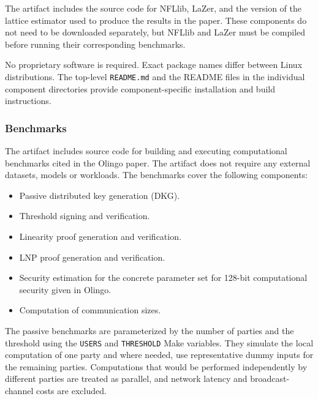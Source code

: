 \documentclass[nonacm,sigconf]{acmart}
\begin{document}
The artifact includes the source code for NFLlib, LaZer, and the version of the lattice estimator used to produce the results in the paper. These components do not need to be downloaded separately, but NFLlib and LaZer must be compiled before running their corresponding benchmarks.

No proprietary software is required. Exact package names differ between Linux distributions. The top-level \texttt{README.md} and the README files in the individual component directories provide component-specific installation and build instructions.

\subsubsection{Benchmarks}


The artifact includes source code for building and executing computational benchmarks cited in the Olingo paper. The artifact does not require any external datasets, models or workloads. The benchmarks cover the following components:

\begin{itemize}
  \item Passive distributed key generation (DKG).
  \item Threshold signing and verification.
  \item Linearity proof generation and verification.
  \item LNP proof generation and verification.
  \item Security estimation for the concrete parameter set for 128-bit computational security given in Olingo.
  \item Computation of communication sizes.
\end{itemize}

The passive benchmarks are parameterized by the number of parties and the threshold using the \texttt{USERS} and \texttt{THRESHOLD} Make variables.
They simulate the local computation of one party and where needed, use representative dummy inputs for the remaining parties.
Computations that would be performed independently by different parties are treated as parallel, and network latency and broadcast-channel costs are excluded.
\end{document}
